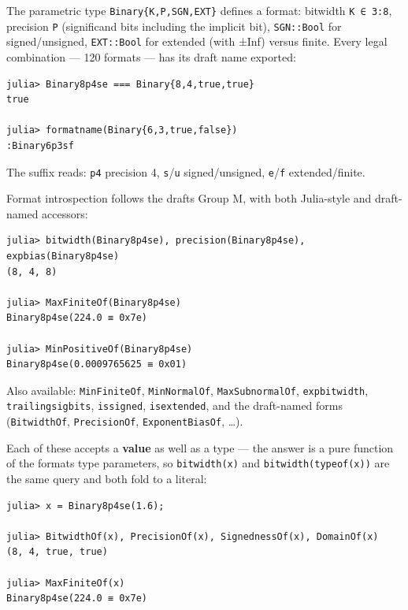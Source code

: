 \label{15797967065273794352}{}


The parametric type \texttt{Binary\{K,P,SGN,EXT\}} defines a format: bitwidth \texttt{K ∈ 3:8}, precision \texttt{P} (significand bits including the implicit bit), \texttt{SGN::Bool} for signed/unsigned, \texttt{EXT::Bool} for extended (with ±Inf) versus finite. Every legal combination — 120 formats — has its draft name exported:




\begin{verbatim}
julia> Binary8p4se === Binary{8,4,true,true}
true

julia> formatname(Binary{6,3,true,false})
:Binary6p3sf
\end{verbatim}



The suffix reads: \texttt{p4} precision 4, \texttt{s}/\texttt{u} signed/unsigned, \texttt{e}/\texttt{f} extended/finite.



Format introspection follows the draft{\textquotesingle}s Group M, with both Julia-style and draft-named accessors:




\begin{verbatim}
julia> bitwidth(Binary8p4se), precision(Binary8p4se), expbias(Binary8p4se)
(8, 4, 8)

julia> MaxFiniteOf(Binary8p4se)
Binary8p4se(224.0 ≡ 0x7e)

julia> MinPositiveOf(Binary8p4se)
Binary8p4se(0.0009765625 ≡ 0x01)
\end{verbatim}



Also available: \texttt{MinFiniteOf}, \texttt{MinNormalOf}, \texttt{MaxSubnormalOf}, \texttt{expbitwidth}, \texttt{trailingsigbits}, \texttt{issigned}, \texttt{isextended}, and the draft-named forms (\texttt{BitwidthOf}, \texttt{PrecisionOf}, \texttt{ExponentBiasOf}, …).



Each of these accepts a \textbf{value} as well as a type — the answer is a pure function of the format{\textquotesingle}s type parameters, so \texttt{bitwidth(x)} and \texttt{bitwidth(typeof(x))} are the same query and both fold to a literal:




\begin{verbatim}
julia> x = Binary8p4se(1.6);

julia> BitwidthOf(x), PrecisionOf(x), SignednessOf(x), DomainOf(x)
(8, 4, true, true)

julia> MaxFiniteOf(x)
Binary8p4se(224.0 ≡ 0x7e)
\end{verbatim}




